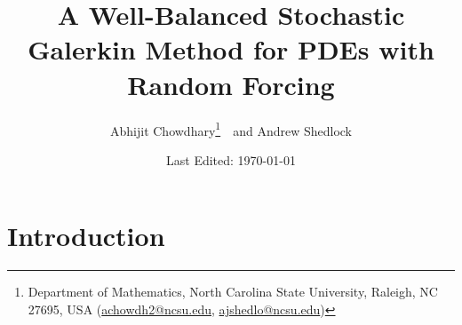 \documentclass[12pt]{article}
\begin{document}
\title{
  A Well-Balanced Stochastic Galerkin Method for PDEs with Random Forcing
}
\author{%
  Abhijit Chowdhary\footnote{%
    Department of Mathematics, North Carolina State University, Raleigh, NC
    27695, USA (\url{achowdh2@ncsu.edu}, \url{ajshedlo@ncsu.edu})
  }\ \ 
  and Andrew Shedlock\footnotemark[1]
}
\date{Last Edited: \today}
\maketitle
\tableofcontents

\clearpage

\section{Introduction}



\cite{Jin2015}


\end{document}
